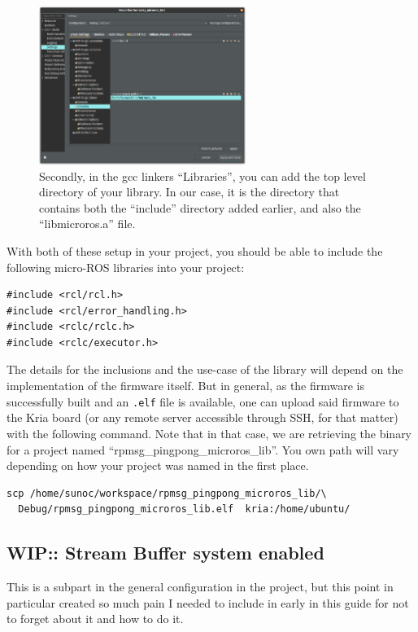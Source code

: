 \documentclass[10pt]{article}
\begin{document}
\begin{figure}[H]
  \centering
  \includegraphics[width=0.6\textwidth]{./img/vitis_new/include2}
  \caption{Secondly, in the gcc linkers ``Libraries'', you can add the top level directory of your library. In our case, it is the
    directory that contains both the ``include'' directory added earlier, and also the ``libmicroros.a'' file.}
\end{figure}

With both of these setup in your project, you should be able to include the following micro-ROS libraries into your project:
\begin{tcolorbox}
\begin{verbatim}
#include <rcl/rcl.h>
#include <rcl/error_handling.h>
#include <rclc/rclc.h>
#include <rclc/executor.h>
\end{verbatim}
\end{tcolorbox}

The details for the inclusions and the use-case of the library will depend on the implementation of the firmware
itself.
But in general, as the firmware is successfully built and an \verb|.elf| file is available, one can upload said
firmware to the Kria board (or any remote server accessible through SSH, for that matter) with the following
command.
Note that in that case, we are retrieving the binary for a project named ``rpmsg\_pingpong\_microros\_lib''.
You own path will vary depending on how your project was named in the first place.
\begin{tcolorbox}
\begin{verbatim}
scp /home/sunoc/workspace/rpmsg_pingpong_microros_lib/\
  Debug/rpmsg_pingpong_microros_lib.elf  kria:/home/ubuntu/
\end{verbatim}
\end{tcolorbox}

\subsection{WIP:: Stream Buffer system enabled}
This is a subpart in the general configuration in the project, but this
point in particular created so much pain I needed to include in early in this
guide for not to forget about it and how to do it.
\end{document}
